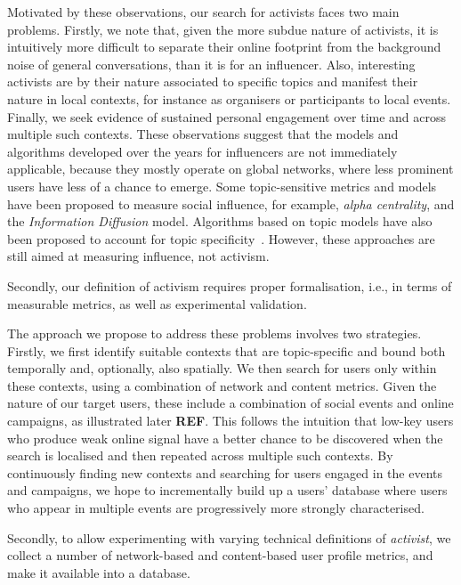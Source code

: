 \documentclass[runningheads]{llncs}
\begin{document}
Motivated by these observations, our search for activists faces two main problems.
%
Firstly, we note that, given the more subdue nature of activists, it is intuitively more difficult to separate their online footprint from the background noise of general conversations, than it is for an influencer.
Also, interesting activists are by their nature associated to specific topics and manifest their nature in local contexts, for instance as organisers or participants to local events. 
Finally, we seek evidence of sustained personal engagement over time and across multiple such contexts. 
These observations suggest that the models and algorithms developed over the years for influencers are not immediately applicable, because they mostly operate on global networks, where less prominent users have less of a chance to emerge. 
Some topic-sensitive metrics and models have been proposed to measure social influence, for example, \textit{alpha centrality}\cite{Bonacich2001,Overbey2013}, and the \textit{Information Diffusion} model. Algorithms based on topic models have also been proposed to account for topic specificity~\cite{Zhao2011b}.  However, these approaches are still aimed at measuring influence, not activism. 

Secondly, our definition of activism requires proper formalisation, i.e., in terms of measurable metrics, as well as experimental validation. 

The approach we propose to address these problems involves two strategies. 
Firstly, we first identify suitable contexts that are topic-specific and bound both temporally and, optionally, also spatially.
We then search for users only within these contexts, using a combination of network and content metrics. 
Given the nature of our target users, these include a combination of social events and online campaigns, as illustrated later \textbf{REF}.
This follows the intuition that low-key users who produce weak online signal have a better chance to be discovered when the search is localised and then repeated across multiple such contexts.
By continuously finding new contexts and searching for users engaged in the events and campaigns, we hope to incrementally build up a users' database where users who appear in multiple events are progressively more strongly characterised.

Secondly, to allow experimenting with varying technical definitions of \textit{activist}, we collect a number of network-based and content-based user profile metrics, and make it available into a database. 
\end{document}
